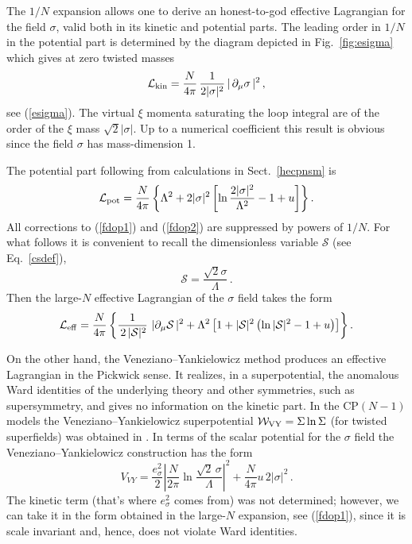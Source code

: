 \documentclass[epsfig,12pt]{article}
\def\beq{\begin{equation}}
\def\eeq{\end{equation}}
\newcommand{\cs}{{\mathcal S}}
\def\beq{\begin{equation}}
\def\eeq{\end{equation}}
\begin{document}
{The $1/N$ expansion allows one to derive an honest-to-god effective
Lagrangian for the field $\sigma$, valid both in its kinetic and potential parts. The  leading order in
$1/N$ in the potential part is determined by the diagram depicted in Fig.~\ref{fig:esigma}
which gives at zero twisted masses
\beq
{\mathcal L}_{\rm kin} =\frac{N}{4\pi}\,\frac{1}{2|\sigma|^2}\,| \,  \partial_\mu\sigma \,|^2
\,,
\label{fdop1}
\eeq
see (\ref{esigma}).
The  virtual $\xi$ momenta saturating the loop integral are of the order of the $\xi$
mass $\sqrt{2}|\sigma|$. Up to a numerical coefficient this result is obvious since the field
$\sigma$ has mass-dimension 1.

The potential part following from calculations in Sect.~\ref{hecpnsm}
is 
\beq
{\mathcal L}_{\rm pot} = \frac{N}{4\pi}\left\{\Lambda^2 +2|\sigma|^2\left[
\ln\frac{2|\sigma|^2}{\Lambda^2}-1+u\right]
\right\}.
\label{fdop2}
\eeq
All corrections to (\ref{fdop1}) and  (\ref{fdop2}) are suppressed by powers
of $1/N$. For what follows it is convenient to recall the dimensionless variable $ \cs $ (see Eq.~\eqref{csdef}),
\beq
\cs = \frac{ \sqrt{2}\sigma}{\Lambda}\,.
\eeq
Then the large-$N$ effective Lagrangian of the $\sigma$ field takes the form
\beq
{\mathcal L}_{\rm eff} =\frac{N}{4\pi}
\left\{
\frac{1}{\,2\, |\cs|^2}\,\,
 | \partial_\mu\cs \, |^2
+\Lambda^2
\left[1 +|\cs |^2\left( \ln |\cs|^2 -1+u\right)\right]
\right\}.
\label{fdop3}
\eeq

On the other hand, 
the Veneziano--Yankielowicz method \cite{VYan} produces 
an effective Lagrangian in the Pickwick sense. It realizes, in a superpotential,  the  anomalous Ward identities of the 
underlying theory
and other symmetries, such as supersymmetry, and gives no information on the kinetic
part. In the CP$(N-1)$ models
the Veneziano--Yankielowicz superpotential ${\mathcal W}_{\rm VY} = \Sigma \ln \Sigma $ (for twisted superfields)
was obtained in \cite{AdDVecSal,ChVa,W93}. 
In terms of the scalar potential for the $\sigma$ field
the Veneziano--Yankielowicz  construction has the form
\beq
V_{VY} = \frac{e^2_\sigma}{2} \left|\frac{N}{2\pi}
\ln\frac{\sqrt{2}\, \sigma}{\Lambda}\right|^2
+\frac{N}{4\pi} u\,2|\sigma|^2\,.
\label{fdop4}
\eeq
The kinetic term (that's where $e^2_\sigma$ comes from) was not determined; however, we can take
it in the form obtained in the large-$N$ expansion, see (\ref{fdop1}),
since it is scale invariant and, hence,  does not violate Ward identities.

}
\end{document}
